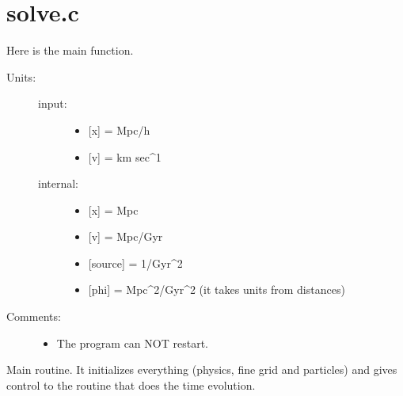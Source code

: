 \documentclass[letterpaper,10pt,english]{sphinxmanual}
\begin{document}
\section{solve.c}
\label{\detokenize{sphinx-c-apidoc/output/solve_c:solve-c}}\label{\detokenize{sphinx-c-apidoc/output/solve_c::doc}}
Here is the main function.
\begin{description}
\item[{Units:}] \leavevmode\begin{description}
\item[{input:}] \leavevmode\begin{itemize}
\item {} 
{[}x{]} = Mpc/h

\item {} 
{[}v{]} = km sec\textasciicircum{}\sphinxhyphen{}1

\end{itemize}

\item[{internal:}] \leavevmode\begin{itemize}
\item {} 
{[}x{]} = Mpc

\item {} 
{[}v{]} = Mpc/Gyr

\item {} 
{[}source{]} = 1/Gyr\textasciicircum{}2

\item {} 
{[}phi{]} = Mpc\textasciicircum{}2/Gyr\textasciicircum{}2 (it takes units from distances)

\end{itemize}

\end{description}

\item[{Comments:}] \leavevmode\begin{itemize}
\item {} 
The program can NOT restart.

\end{itemize}

\end{description}

\begin{fulllineitems}
\label{\detokenize{sphinx-c-apidoc/output/solve_c:c.main}}%
\pysigstartmultiline
{}%
\pysigstopmultiline
Main routine.  It initializes everything (physics, fine grid and particles) and gives control to the routine that does the time evolution.

\end{fulllineitems}
\end{document}
